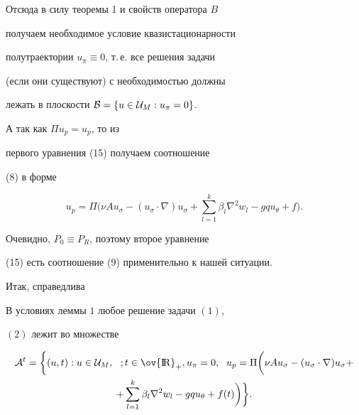 Отсюда в силу теоремы 1 и свойств оператора $B$


получаем необходимое условие квазистационарности


полутраектории $u_{\pi} \equiv 0$, т.\,е. все решения задачи


(если они существуют) с необходимостью должны


лежать в плоскости ${\cal B}=\{u \in {\cal U}_M: u_{\pi}=0 \}$.


А так как $\Pi u_p=u_p$, то из


первого уравнения (15) получаем соотношение


(8) в форме


\begin{equation}


u_p=\Pi \bigg(\nu A u_{\sigma} - (u_{\sigma} \cdot \nabla) u_{\sigma}


+\sum\limits_{l=1}^k {\beta}_l {\nabla}^2 w_l-g q u_{\theta}+f\bigg).


\end{equation}


Очевидно, $P_0 \equiv P_R$, поэтому второе уравнение


(15) есть соотношение (9) применительно к нашей ситуации.


Итак, справедлива





\begin{lem}


В условиях леммы $1$ любое решение задачи $(1)$,


$(2)$ лежит во множестве


\begin{multline*}


{\cal A}^t=\bigg\{(u,t):u \in {\cal U}_M,\ \ ; t \in {\ov {\R}_+},


u_{\pi}=0,\ \; u_p=\Pi \bigg(


\nu Au_{\sigma}-(u_{\sigma} \cdot \nabla)u_{\sigma}+ \\


+\sum\limits_{l=1}^k {\beta}_l {\nabla}^2 w_l-g q u_{\theta}+f(t)


\bigg) \bigg\}.


\end{multline*}


\end{lem}





